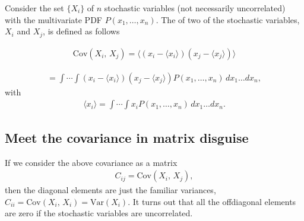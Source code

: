 \documentclass[letterpaper,10pt,english]{sphinxmanual}
\begin{document}
Consider the set \(\{X_i\}\) of \(n\)
stochastic variables (not necessarily uncorrelated) with the
multivariate PDF \(P(x_1,\dots,x_n)\). The  of two
of the stochastic variables, \(X_i\) and \(X_j\), is defined as follows




\begin{equation*}
\begin{split}
\begin{equation}
\mathrm{Cov}(X_i,\,X_j)  = \langle (x_i-\langle x_i\rangle)(x_j-\langle x_j\rangle)\rangle 
\label{_auto2} \tag{4}
\end{equation}
\end{split}
\end{equation*}



\begin{equation*}
\begin{split}
\begin{equation} 
=\int\cdots\int (x_i-\langle x_i\rangle)(x_j-\langle x_j\rangle)P(x_1,\dots,x_n)\,dx_1\dots dx_n,
\label{eq:def_covariance} \tag{5}
\end{equation}
\end{split}
\end{equation*}
with
\begin{equation*}
\begin{split}
\langle x_i\rangle =
\int\cdots\int x_i P(x_1,\dots,x_n)\,dx_1\dots dx_n.
\end{split}
\end{equation*}

\subsection{Meet the  covariance in matrix disguise}
\label{\detokenize{chapter3:meet-the-covariance-in-matrix-disguise}}
If we consider the above covariance as a matrix
\begin{equation*}
\begin{split}
C_{ij} =\mathrm{Cov}(X_i,\,X_j),
\end{split}
\end{equation*}
then the diagonal elements are just the familiar
variances, \(C_{ii} = \mathrm{Cov}(X_i,\,X_i) = \mathrm{Var}(X_i)\). It turns out that
all the off\sphinxhyphen{}diagonal elements are zero if the stochastic variables are
uncorrelated.
\end{document}
